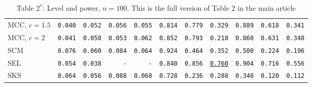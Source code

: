 \begin{table}[h]
{\begin{tabular}{l|rrrr|rrrrrr}
MCC, $\scriptstyle c = 1.5$&\texttt{0.040}&\texttt{0.052}&\texttt{0.056}&\texttt{0.055}&\texttt{0.814}&\texttt{0.779}&\texttt{0.329}&\texttt{0.889}&\texttt{0.618}&\texttt{0.341}\\
MCC, $\scriptstyle c = 2$&\texttt{0.041}&\texttt{0.050}&\texttt{0.053}&\texttt{0.062}&\texttt{0.852}&\texttt{0.793}&\texttt{0.218}&\texttt{0.860}&\texttt{0.631}&\texttt{0.348}\\
SCM&\texttt{0.076}&\texttt{0.060}&\texttt{0.084}&\texttt{0.064}&\texttt{0.924}&\texttt{0.464}&\texttt{0.352}&\texttt{0.500}&\texttt{0.224}&\texttt{0.196}\\
SEL&\texttt{0.054}&\texttt{0.038}&\texttt{-}&\texttt{-}&\texttt{0.840}&\texttt{0.856}&\texttt{\underline{0.760}}&\texttt{0.904}&\texttt{0.716}&\texttt{0.556}\\
SKS&\texttt{0.064}&\texttt{0.056}&\texttt{0.088}&\texttt{0.068}&\texttt{0.728}&\texttt{0.236}&\texttt{0.288}&\texttt{0.340}&\texttt{0.120}&\texttt{0.112}\\
\bottomrule
\end{tabular}}
\caption*{Table 2$^*$: Level and power, $n = 100$. This is the full version of Table 2 in the main article}
\label{tab:n100}
\end{table}




